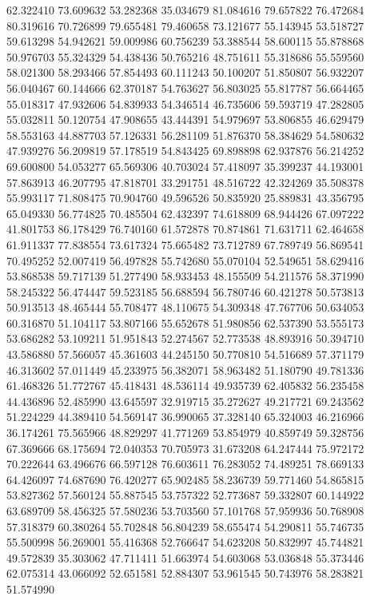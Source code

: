 62.322410
73.609632
53.282368
35.034679
81.084616
79.657822
76.472684
80.319616
70.726899
79.655481
79.460658
73.121677
55.143945
53.518727
59.613298
54.942621
59.009986
60.756239
53.388544
58.600115
55.878868
50.976703
55.324329
54.438436
50.765216
48.751611
55.318686
55.559560
58.021300
58.293466
57.854493
60.111243
50.100207
51.850807
56.932207
56.040467
60.144666
62.370187
54.763627
56.803025
55.817787
56.664465
55.018317
47.932606
54.839933
54.346514
46.735606
59.593719
47.282805
55.032811
50.120754
47.908655
43.444391
54.979697
53.806855
46.629479
58.553163
44.887703
57.126331
56.281109
51.876370
58.384629
54.580632
47.939276
56.209819
57.178519
54.843425
69.898898
62.937876
56.214252
69.600800
54.053277
65.569306
40.703024
57.418097
35.399237
44.193001
57.863913
46.207795
47.818701
33.291751
48.516722
42.324269
35.508378
55.993117
71.808475
70.904760
49.596526
50.835920
25.889831
43.356795
65.049330
56.774825
70.485504
62.432397
74.618809
68.944426
67.097222
41.801753
86.178429
76.740160
61.572878
70.874861
71.631711
62.464658
61.911337
77.838554
73.617324
75.665482
73.712789
67.789749
56.869541
70.495252
52.007419
56.497828
55.742680
55.070104
52.549651
58.629416
53.868538
59.717139
51.277490
58.933453
48.155509
54.211576
58.371990
58.245322
56.474447
59.523185
56.688594
56.780746
60.421278
50.573813
50.913513
48.465444
55.708477
48.110675
54.309348
47.767706
50.634053
60.316870
51.104117
53.807166
55.652678
51.980856
62.537390
53.555173
53.686282
53.109211
51.951843
52.274567
52.773538
48.893916
50.394710
43.586880
57.566057
45.361603
44.245150
50.770810
54.516689
57.371179
46.313602
57.011449
45.233975
56.382071
58.963482
51.180790
49.781336
61.468326
51.772767
45.418431
48.536114
49.935739
62.405832
56.235458
44.436896
52.485990
43.645597
32.919715
35.272627
49.217721
69.243562
51.224229
44.389410
54.569147
36.990065
37.328140
65.324003
46.216966
36.174261
75.565966
48.829297
41.771269
53.854979
40.859749
59.328756
67.369666
68.175694
72.040353
70.705973
31.673208
64.247444
75.972172
70.222644
63.496676
66.597128
76.603611
76.283052
74.489251
78.669133
64.426097
74.687690
76.420277
65.902485
58.236739
59.771460
54.865815
53.827362
57.560124
55.887545
53.757322
52.773687
59.332807
60.144922
63.689709
58.456325
57.580236
53.703560
57.101768
57.959936
50.768908
57.318379
60.380264
55.702848
56.804239
58.655474
54.290811
55.746735
55.500998
56.269001
55.416368
52.766647
54.623208
50.832997
45.744821
49.572839
35.303062
47.711411
51.663974
54.603068
53.036848
55.373446
62.075314
43.066092
52.651581
52.884307
53.961545
50.743976
58.283821
51.574990
